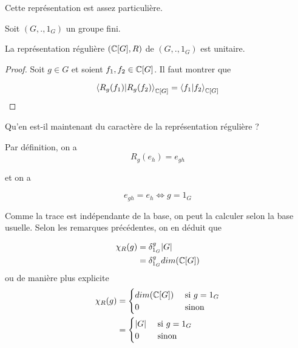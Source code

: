 Cette représentation est assez particulière.

\begin{proposition}
	Soit $(G, ., 1_{G})$ un groupe fini.

	La représentation régulière $(\mathbb{C}[G], R)$ de $(G, .,
	1_{G})$ est unitaire.
\end{proposition}

\ifdefined\outputproof
\begin{proof}
	Soit $g \in G$ et soient $f_{1}, f_{2} \in \mathbb{C}[G]$. Il faut montrer que

	\begin{equation}
		\bra{R_{g}(f_{1})}\ket{R_{g}(f_{2})}_{\mathbb{C}[G]} =
		\bra{f_{1}}\ket{f_{2}}_{\mathbb{C}[G]}
	\end{equation}
\end{proof}
\fi

Qu'en est-il maintenant du caractère de la représentation régulière ?

Par définition, on a
\begin{equation}
	R_{g}(e_{h}) = e_{gh}
\end{equation}

et on a

\begin{equation}
	e_{gh} = e_{h} \Leftrightarrow g = 1_{G}
\end{equation}

Comme la trace est indépendante de la base, on peut la calculer selon la base
usuelle. Selon les remarques précédentes, on en déduit que

\begin{align}
	\chi_{R}(g) & = \delta_{1_{G}}^{g} |G| \\
	& = \delta_{1_{G}}^{g} dim(\mathbb{C}[G]) \\
\end{align}
ou de manière plus explicite
\begin{align}
	\chi_{R}(g) & =
		\begin{cases}
			dim(\mathbb{C}[G])	& \text{ si $g = 1_{G}$} \\
			0					& \text{ sinon}
		\end{cases} \\
		& =
		\begin{cases}
			|G|	& \text{ si $g = 1_{G}$} \\
			0					& \text{ sinon}
		\end{cases}
\end{align}

